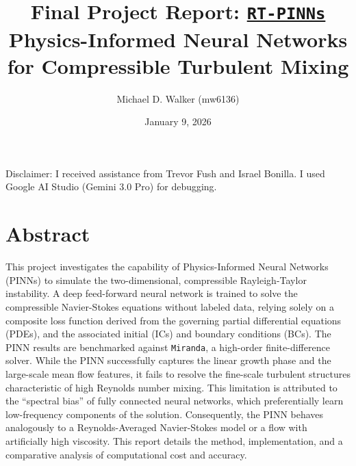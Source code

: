 \documentclass{homework}
\author{Michael D. Walker (mw6136)}
\date{January 9, 2026}
\title{Final Project Report: \href{https://github.com/mw6136/RT-PINNs}{\texttt{RT-PINNs}}\\ Physics-Informed Neural Networks for Compressible Turbulent Mixing}
\begin{document}
\maketitle


Disclaimer: I received assistance from Trevor Fush and Israel Bonilla. I used Google AI Studio (Gemini 3.0 Pro) for debugging.

\section*{Abstract}
This project investigates the capability of Physics-Informed Neural Networks (PINNs) to simulate the two-dimensional, compressible Rayleigh-Taylor instability. A deep feed-forward neural network is trained to solve the compressible Navier-Stokes equations without labeled data, relying solely on a composite loss function derived from the governing partial differential equations (PDEs), and the associated initial (ICs) and boundary conditions (BCs). The PINN results are benchmarked against \texttt{Miranda}, a high-order finite-difference solver. While the PINN successfully captures the linear growth phase and the large-scale mean flow features, it fails to resolve the fine-scale turbulent structures characteristic of high Reynolds number mixing. This limitation is attributed to the ``spectral bias'' of fully connected neural networks, which preferentially learn low-frequency components of the solution. Consequently, the PINN behaves analogously to a Reynolds-Averaged Navier-Stokes model or a flow with artificially high viscosity. This report details the method, implementation, and a comparative analysis of computational cost and accuracy.
\end{document}
